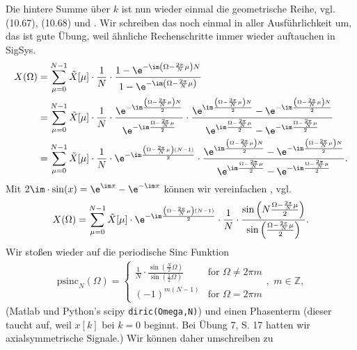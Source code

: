 \begin{ExCalc}
Die hintere Summe über $k$ ist nun wieder einmal die geometrische Reihe, vgl. (10.67), (10.68)
und \cite[(3-39)]{Lyons2011}.
Wir schreiben das noch einmal in aller Ausführlichkeit um, das ist gute Übung,
weil ähnliche Rechenschritte immer wieder auftauchen in SigSys.
%
\begin{align}
X(\Omega)&=\sum_{\mu=0}^{N-1}\tilde{X}[\mu]\cdot\frac{1}{N}\cdot\frac{1-\e^{-\im\left(\Omega-\frac{2\pi}{N}\mu\right)N}}{1-\e^{-\im\left(\Omega-\frac{2\pi}{N}\mu\right)}}\\
&=\sum_{\mu=0}^{N-1}\tilde{X}[\mu]\cdot\frac{1}{N}\cdot\frac{\e^{-\im\frac{\left(\Omega-\frac{2\pi}{N}\mu\right)N}{2}}}{\e^{-\im\frac{\Omega-\frac{2\pi}{N}\mu}{2}}}\cdot\frac{\e^{\im\frac{\left(\Omega-\frac{2\pi}{N}\mu\right)N}{2}}-\e^{-\im\frac{\left(\Omega-\frac{2\pi}{N}\mu\right)N}{2}}}{\e^{\im\frac{\Omega-\frac{2\pi}{N}\mu}{2}}-\e^{-\im\frac{\Omega-\frac{2\pi}{N}\mu}{2}}}\\
&=\sum_{\mu=0}^{N-1}\tilde{X}[\mu]\cdot\frac{1}{N}\cdot\e^{-\im\frac{\left(\Omega-\frac{2\pi}{N}\mu\right)(N-1)}{2}}\cdot\frac{\e^{\im\frac{\left(\Omega-\frac{2\pi}{N}\mu\right)N}{2}}-\e^{-\im\frac{\left(\Omega-\frac{2\pi}{N}\mu\right)N}{2}}}{\e^{\im\frac{\Omega-\frac{2\pi}{N}\mu}{2}}-\e^{-\im\frac{\Omega-\frac{2\pi}{N}\mu}{2}}}.
\end{align}
%
Mit $2\im\cdot\sin(x)=\e^{\im x}-\e^{-\im x}$ können wir vereinfachen
\cite[(2.41)]{Moeser2011}, vgl. \cite[(2.142)]{Rabiner1975}
%
\begin{equation}
X(\Omega)=\sum_{\mu=0}^{N-1}\tilde{X}[\mu]\cdot\e^{-\im\frac{\left(\Omega-\frac{2\pi}{N}\mu\right)(N-1)}{2}}\cdot\frac{1}{N}\cdot\frac{\sin\left(N\frac{\Omega-\frac{2\pi}{N}\mu}{2}\right)}{\sin\left(\frac{\Omega-\frac{2\pi}{N}\mu}{2}\right)}.
\end{equation}
%
Wir stoßen wieder auf die  periodische Sinc Funktion
%
\begin{align}
\text{psinc}_N(\Omega)=\begin{cases}\frac{1}{N}\cdot\frac{\sin\left(\frac{N}{2}\Omega\right)}{\sin\left(\frac{1}{2}\Omega\right)}&\text{for }\Omega\neq2\pi m\\
(-1)^{m(N-1)}&\text{for }\Omega=2\pi m\end{cases},\,\,m\in\mathbb{Z},
\end{align}
%
(Matlab und Python's scipy \texttt{diric(Omega,N)}) und einen Phasenterm (dieser
taucht auf, weil $x[k]$ bei $k=0$ beginnt.
Bei Übung 7, S. 17 hatten wir axialsymmetrische Signale.)
%
Wir können daher umschreiben zu

\end{ExCalc}
